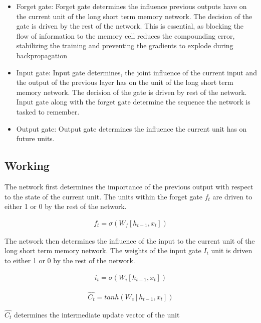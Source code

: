 \documentclass[sigconf]{acmart}
\begin{document}
\begin{itemize}
\setlength\itemsep{1em}
\item Forget gate: Forget gate determines the influence previous outputs have on the current unit of the long short term memory network. The decision of the gate is driven by the rest of the network. This is essential, as blocking the flow of information to the memory cell reduces the compounding error, stabilizing the training and preventing the gradients to explode during backpropagation

\item Input gate: Input gate determines, the joint influence of the current input and the output of the previous layer has on the unit of the long short term memory network. The decision of the gate is driven by rest of the network. Input gate along with the forget gate determine the sequence the network is tasked to remember.  

\item Output gate: Output gate determines the influence the current unit has on future units. 

\end{itemize}

\subsection{Working}

The network first determines the importance of the previous output with respect to the state of the current unit. The units within the forget gate $f_t$ are driven to either 1 or 0 by the rest of the network.

\begin{align} \label{eqn15}
f_t = \sigma (W_f [h_{t-1},x_t])
\end{align}

The network then determines the influence of the input to the current unit of the long short term memory network. The weights of the input gate $I_t$ unit is driven to either 1 or 0 by the rest of the network. 

\begin{align} \label{eqn16}
i_t = \sigma (W_i [h_{t-1},x_t])
\end{align}

\begin{align} \label{eqn17}
\hat{C_t} = tanh (W_c [h_{t-1},x_t])
\end{align}

$ \hat{C_t} $ determines the intermediate update vector of the unit 
\end{document}
